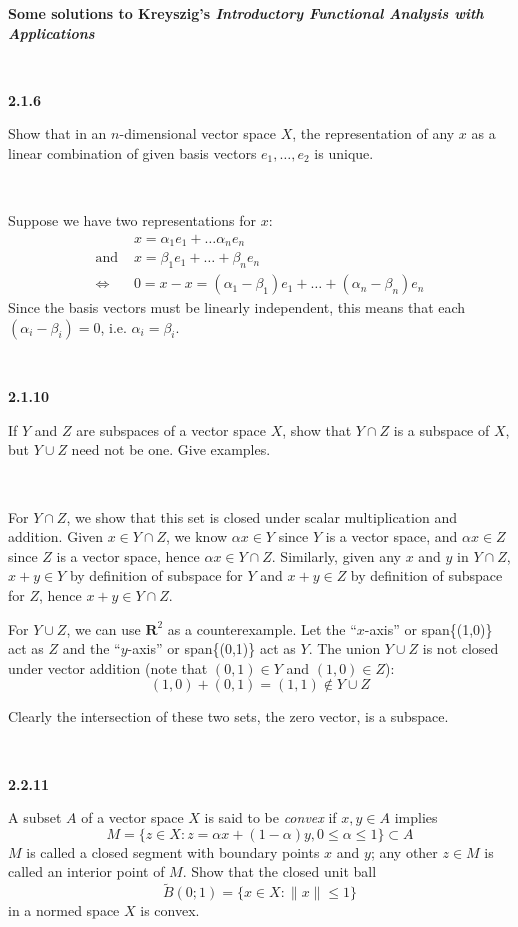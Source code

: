 \documentclass{article}
\newcommand{\R}{\textbf{R}}
\begin{document}
\textbf{Some solutions to Kreyszig's
  \textit{Introductory Functional Analysis with Applications}
}

\

\textbf{2.1.6}

Show that in an $n$-dimensional vector space $X$,
the representation of any $x$ as a linear combination of given basis
vectors $e_1, \dots, e_2$ is unique.

\

Suppose we have two representations for $x$:
\begin{align*}
  & x = \alpha_1e_1 + \dots \alpha_n e_n \\
  \text{and } & x = \beta_1e_1 + \dots + \beta_n e_n \\
\iff & 0 = x-x = (\alpha_1-\beta_1)e_1 + \dots + (\alpha_n-\beta_n) e_n 
\end{align*}
Since the basis vectors must be linearly independent,
this means that each $(\alpha_i-\beta_i) = 0$,
i.e. $\alpha_i = \beta_i$.

\

\textbf{2.1.10}

If $Y$ and $Z$ are subspaces of a vector space $X$,
show that $Y \cap Z$ is a subspace of $X$,
but $Y \cup Z$ need not be one. 
Give examples. 

\

For $Y \cap Z$,
we show that this set is closed under scalar multiplication and addition. 
Given $x \in Y\cap Z$,
we know $\alpha x \in Y$ since $Y$ is a vector space,
and $\alpha x \in Z$ since $Z$ is a vector space,
hence $\alpha x \in Y \cap Z$. 
Similarly, 
given any $x$ and $y$ in $Y \cap Z$,
$x+y \in Y$ by definition of subspace for $Y$ and
$x+y \in Z$ by definition of subspace for $Z$,
hence $x+y \in Y \cap Z$. 

For $Y \cup Z$,
we can use $\R^2$ as a counterexample.
Let the ``$x$-axis'' or span\{(1,0)\} act as $Z$ and the
``$y$-axis'' or span\{(0,1)\} act as $Y$.
The union $Y \cup Z$ is not closed under vector addition
(note that $(0,1) \in Y$ and $(1,0) \in Z$): 
$$(1,0) + (0,1) = (1,1) \notin Y \cup Z$$

Clearly the intersection of these two sets, the zero vector, is a subspace. 

\

\textbf{2.2.11}

A subset $A$ of a vector space $X$ is said to be \textit{convex}
if $x,y \in A$ implies
$$ M = \{z \in X : z = \alpha x + (1-\alpha) y, 0 \leq \alpha \leq 1 \} \subset A$$
$M$ is called a closed segment with boundary points $x$ and $y$;
any other $z\in M$ is called an interior point of $M$.
Show that the closed unit ball
$$ \tilde{B}(0;1) = \{x\in X : \lVert x \rVert \leq 1 \}$$
in a normed space $X$ is convex. 
\end{document}
